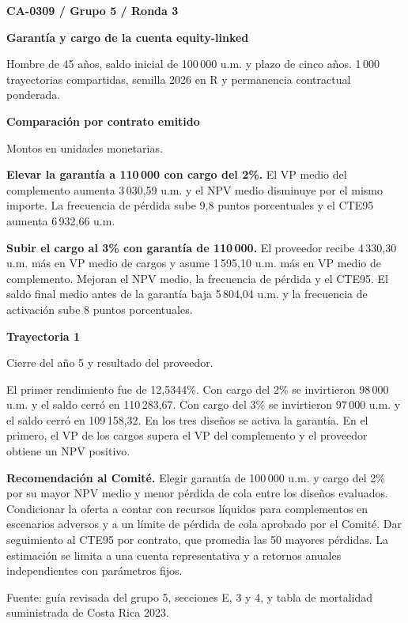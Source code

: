 \documentclass[11pt,letterpaper]{article}
\begin{document}
{\small\bfseries\color{gris} CA-0309 \enspace / \enspace Grupo 5 \enspace / \enspace Ronda 3\par}
{\LARGE\bfseries\color{azul} Garantía y cargo de la cuenta equity-linked\par}
{\small Hombre de 45 años, saldo inicial de 100\,000 u.m. y plazo de cinco años.
1\,000 trayectorias compartidas, semilla 2026 en R y permanencia contractual ponderada.\par}
\vspace{4pt}

\textbf{\color{azul}Comparación por contrato emitido}
{\small\color{gris}\enspace Montos en unidades monetarias.\par}
\smallskip


\textbf{Elevar la garantía a 110\,000 con cargo del 2\%.}
El VP medio del complemento aumenta 3\,030,59 u.m. y el NPV medio disminuye por el mismo importe.
La frecuencia de pérdida sube 9,8 puntos porcentuales y el CTE95 aumenta 6\,932,66 u.m.

\textbf{Subir el cargo al 3\% con garantía de 110\,000.}
El proveedor recibe 4\,330,30 u.m. más en VP medio de cargos y asume 1\,595,10 u.m. más en VP medio de complemento.
Mejoran el NPV medio, la frecuencia de pérdida y el CTE95. El saldo final medio antes de la garantía baja 5\,804,04 u.m. y la frecuencia de activación sube 8 puntos porcentuales.

\vspace{3pt}
\textbf{\color{azul}Trayectoria 1}
{\small\color{gris}\enspace Cierre del año 5 y resultado del proveedor.\par}
\smallskip


El primer rendimiento fue de 12,5344\%. Con cargo del 2\% se invirtieron 98\,000 u.m. y el saldo cerró en 110\,283,67.
Con cargo del 3\% se invirtieron 97\,000 u.m. y el saldo cerró en 109\,158,32.
En los tres diseños se activa la garantía. En el primero, el VP de los cargos supera el VP del complemento y el proveedor obtiene un NPV positivo.

\vspace{3pt}
\textbf{\color{azul}Recomendación al Comité.}
Elegir garantía de 100\,000 u.m. y cargo del 2\% por su mayor NPV medio y menor pérdida de cola entre los diseños evaluados.
Condicionar la oferta a contar con recursos líquidos para complementos en escenarios adversos y a un límite de pérdida de cola aprobado por el Comité.
Dar seguimiento al CTE95 por contrato, que promedia las 50 mayores pérdidas.
La estimación se limita a una cuenta representativa y a retornos anuales independientes con parámetros fijos.

\vfill
{\footnotesize\color{gris} Fuente: guía revisada del grupo 5, secciones E, 3 y 4, y tabla de mortalidad suministrada de Costa Rica 2023.\par}
\end{document}
